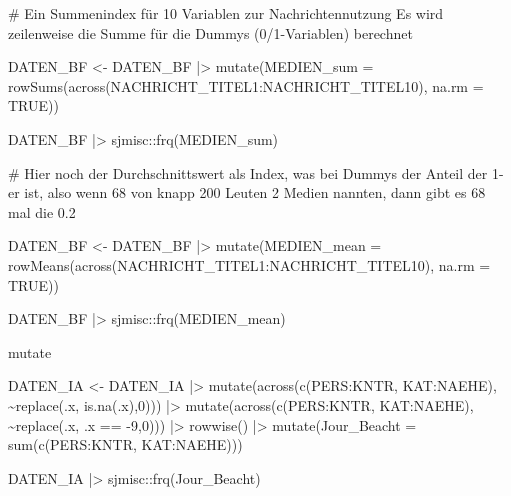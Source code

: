 \documentclass[twoside, pagesize, fontsize=11pt, dvipsnames]{scrreport}
\newenvironment{Shaded}{\begin{snugshade}}{\end{snugshade}}
\newcommand{\AttributeTok}[1]{\textcolor[rgb]{0.40,0.45,0.13}{#1}}
\newcommand{\CommentTok}[1]{\textcolor[rgb]{0.37,0.37,0.37}{#1}}
\newcommand{\ConstantTok}[1]{\textcolor[rgb]{0.56,0.35,0.01}{#1}}
\newcommand{\DecValTok}[1]{\textcolor[rgb]{0.68,0.00,0.00}{#1}}
\newcommand{\FunctionTok}[1]{\textcolor[rgb]{0.28,0.35,0.67}{#1}}
\newcommand{\NormalTok}[1]{\textcolor[rgb]{0.00,0.23,0.31}{#1}}
\newcommand{\OtherTok}[1]{\textcolor[rgb]{0.00,0.23,0.31}{#1}}
\newcommand{\SpecialCharTok}[1]{\textcolor[rgb]{0.37,0.37,0.37}{#1}}
\begin{document}
\begin{Shaded}
\begin{Highlighting}[]
\CommentTok{\# Ein Summenindex für 10 Variablen zur Nachrichtennutzung Es wird zeilenweise die Summe für die Dummys (0/1{-}Variablen) berechnet}

\NormalTok{DATEN\_BF }\OtherTok{\textless{}{-}}\NormalTok{ DATEN\_BF }\SpecialCharTok{|\textgreater{}} 
  \FunctionTok{mutate}\NormalTok{(}\AttributeTok{MEDIEN\_sum =} \FunctionTok{rowSums}\NormalTok{(}\FunctionTok{across}\NormalTok{(NACHRICHT\_TITEL1}\SpecialCharTok{:}\NormalTok{NACHRICHT\_TITEL10), }\AttributeTok{na.rm =} \ConstantTok{TRUE}\NormalTok{))}

\NormalTok{DATEN\_BF }\SpecialCharTok{|\textgreater{}} 
\NormalTok{  sjmisc}\SpecialCharTok{::}\FunctionTok{frq}\NormalTok{(MEDIEN\_sum)}

\CommentTok{\# Hier noch der Durchschnittswert als Index, was bei Dummys der Anteil der 1{-}er ist, also wenn 68 von knapp 200 Leuten 2 Medien nannten, dann gibt es 68 mal die 0.2 }

\NormalTok{DATEN\_BF }\OtherTok{\textless{}{-}}\NormalTok{ DATEN\_BF }\SpecialCharTok{|\textgreater{}} 
  \FunctionTok{mutate}\NormalTok{(}\AttributeTok{MEDIEN\_mean =} \FunctionTok{rowMeans}\NormalTok{(}\FunctionTok{across}\NormalTok{(NACHRICHT\_TITEL1}\SpecialCharTok{:}\NormalTok{NACHRICHT\_TITEL10), }\AttributeTok{na.rm =} \ConstantTok{TRUE}\NormalTok{))}

\NormalTok{DATEN\_BF }\SpecialCharTok{|\textgreater{}} 
\NormalTok{  sjmisc}\SpecialCharTok{::}\FunctionTok{frq}\NormalTok{(MEDIEN\_mean)}

\NormalTok{mutate}

\NormalTok{DATEN\_IA }\OtherTok{\textless{}{-}}\NormalTok{ DATEN\_IA }\SpecialCharTok{|\textgreater{}} 
  \FunctionTok{mutate}\NormalTok{(}\FunctionTok{across}\NormalTok{(}\FunctionTok{c}\NormalTok{(PERS}\SpecialCharTok{:}\NormalTok{KNTR, KAT}\SpecialCharTok{:}\NormalTok{NAEHE), }\SpecialCharTok{\textasciitilde{}}\FunctionTok{replace}\NormalTok{(.x, }\FunctionTok{is.na}\NormalTok{(.x),}\DecValTok{0}\NormalTok{))) }\SpecialCharTok{|\textgreater{}} 
  \FunctionTok{mutate}\NormalTok{(}\FunctionTok{across}\NormalTok{(}\FunctionTok{c}\NormalTok{(PERS}\SpecialCharTok{:}\NormalTok{KNTR, KAT}\SpecialCharTok{:}\NormalTok{NAEHE), }\SpecialCharTok{\textasciitilde{}}\FunctionTok{replace}\NormalTok{(.x, .x }\SpecialCharTok{==} \SpecialCharTok{{-}}\DecValTok{9}\NormalTok{,}\DecValTok{0}\NormalTok{))) }\SpecialCharTok{|\textgreater{}} 
  \FunctionTok{rowwise}\NormalTok{() }\SpecialCharTok{|\textgreater{}} 
  \FunctionTok{mutate}\NormalTok{(}\AttributeTok{Jour\_Beacht =} \FunctionTok{sum}\NormalTok{(}\FunctionTok{c}\NormalTok{(PERS}\SpecialCharTok{:}\NormalTok{KNTR, KAT}\SpecialCharTok{:}\NormalTok{NAEHE)))}

\NormalTok{DATEN\_IA }\SpecialCharTok{|\textgreater{}}\NormalTok{ sjmisc}\SpecialCharTok{::}\FunctionTok{frq}\NormalTok{(Jour\_Beacht)}
\end{Highlighting}
\end{Shaded}
\end{document}
